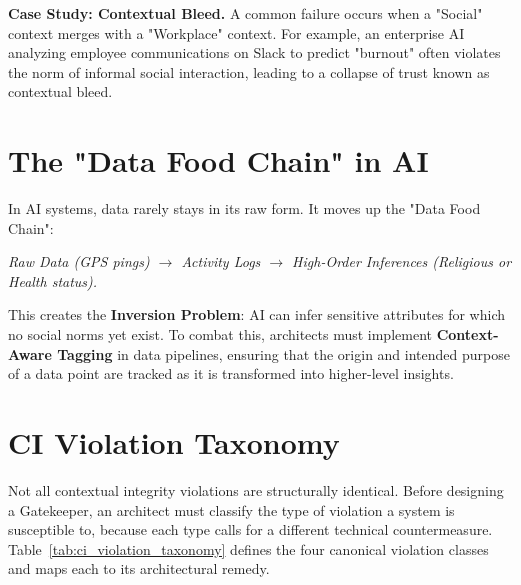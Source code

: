 \textbf{Case Study: Contextual Bleed.} A common failure occurs when a "Social" context merges with a "Workplace" context. For example, an enterprise AI analyzing employee communications on Slack to predict "burnout" often violates the norm of informal social interaction, leading to a collapse of trust known as contextual bleed.

\section{The "Data Food Chain" in AI}
\label{sec:data_food_chain}

In AI systems, data rarely stays in its raw form. It moves up the "Data Food Chain":
\begin{center}
\textit{Raw Data (GPS pings) $\rightarrow$ Activity Logs $\rightarrow$ High-Order Inferences (Religious or Health status).}
\end{center}

This creates the \textbf{Inversion Problem}: AI can infer sensitive attributes for which no social norms yet exist. To combat this, architects must implement \textbf{Context-Aware Tagging} in data pipelines, ensuring that the origin and intended purpose of a data point are tracked as it is transformed into higher-level insights.

\section{CI Violation Taxonomy}
\label{sec:ci_violation_taxonomy}

Not all contextual integrity violations are structurally identical. Before designing a Gatekeeper, an architect must classify the type of violation a system is susceptible to, because each type calls for a different technical countermeasure. Table~\ref{tab:ci_violation_taxonomy} defines the four canonical violation classes and maps each to its architectural remedy.


